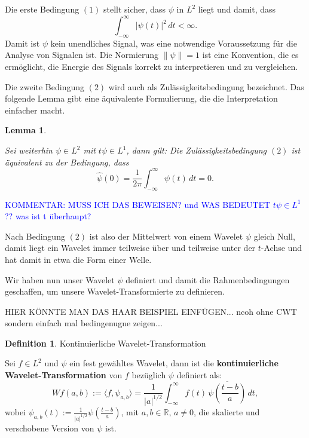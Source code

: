 \documentclass[a4paper,11pt,bibliography=totoc,listof=totoc,headinclude=true,cleardoublepage=empty,oneside]{scrbook}
\newcommand{\norm}[1]{\left\lVert #1 \right\rVert}
\newtheorem{lemma}[theorem]{Lemma}
\theoremstyle{definition}
\newtheorem{definition}[theorem]{Definition}
\theoremstyle{remark}
\begin{document}
Die erste Bedingung $(1)$ stellt sicher, dass $\psi$ in $L^2$ liegt und damit, dass
\[
  \int_{-\infty}^{\infty} |\psi(t)|^2 \, dt < \infty.
\]
Damit ist $\psi$ kein \glqq unendliches Signal\grqq, was eine notwendige Voraussetzung für
die Analyse von Signalen ist.
Die Normierung $\norm{\psi} = 1$ ist eine Konvention, die es ermöglicht, die Energie des
Signals korrekt zu interpretieren und zu vergleichen.

Die zweite Bedingung $(2)$ wird auch als Zulässigkeitsbedingung bezeichnet.
Das folgende Lemma gibt eine äquivalente Formulierung, die die Interpretation einfacher macht.

\begin{lemma} \cite[S.~54, Section~3.1]{blatterWaveletsEinfuhrung2003}

  Sei weiterhin $\psi \in L^2$ mit $t\psi \in L^1$, dann gilt:
  Die Zulässigkeitsbedingung $(2)$ ist äquivalent zu der Bedingung, dass
  \[
    \hat\psi(0) = \frac{1}{2\pi} \int_{-\infty}^{\infty} \psi(t) \, dt = 0.
  \]

\end{lemma}

\textcolor{blue}{KOMMENTAR: MUSS ICH DAS BEWEISEN? und WAS BEDEUTET $t\psi \in L^1$?? was ist t überhaupt?}

Nach Bedingung $(2)$ ist also der Mittelwert von einem Wavelet $\psi$ gleich Null, damit liegt
ein Wavelet immer teilweise über und teilweise unter der $t$-Achse und hat damit in etwa die
Form einer Welle.

Wir haben nun unser Wavelet $\psi$ definiert und damit die Rahmenbedingungen geschaffen, um
unsere Wavelet-Transformierte zu definieren.

HIER KÖNNTE MAN DAS HAAR BEISPIEL EINFÜGEN... ncoh ohne CWT sondern einfach mal bedingenugne zeigen...

\begin{definition}{Kontinuierliche Wavelet-Transformation} \cite[S.~55, Section~3.1]{blatterWaveletsEinfuhrung2003}

  Sei $f \in L^2$ und $\psi$ ein fest gewähltes Wavelet, dann ist die \textbf{kontinuierliche
  Wavelet-Transformation} von $f$ bezüglich $\psi$ definiert als:
  \[
    Wf(a,b) := \langle f, \psi_{a,b} \rangle
    = \frac{1}{|a|^{1/2}} \int_{-\infty}^{\infty} f(t)\,\overline{\psi\!\left(\frac{t-b}{a}\right)}\,dt,
  \]
  wobei $\psi_{a,b}(t) := \frac{1}{|a|^{1/2}} \psi\!\left(\frac{t-b}{a}\right)$, mit
  $a, b \in \mathbb{R},\, a \neq 0$, die skalierte und verschobene Version von $\psi$ ist.

\end{definition}
\end{document}
